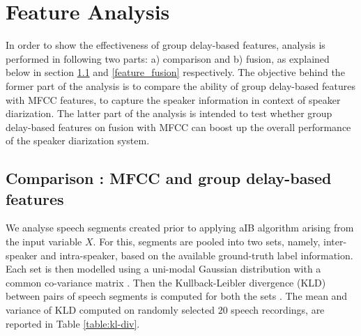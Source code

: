 \documentclass[conference]{IEEEtran}
\begin{document}

\section{Feature Analysis}
\label{feature_analysis_and_fusion}
In order to show the effectiveness of group delay-based features, analysis is
performed in following two parts: a) comparison and b) fusion, as explained
below in section \ref{feature_analysis} and \ref{feature_fusion} respectively.
The objective behind the former part of the analysis is to compare the ability
of group delay-based features with MFCC features, to capture the speaker
information in context of speaker diarization. The latter part of the
analysis is intended to test whether group delay-based features on fusion with
MFCC can boost up the overall performance of the speaker diarization system. 
 
\subsection{Comparison : MFCC and group delay-based features}
\label{feature_analysis}

We analyse speech segments created prior to applying aIB algorithm arising from
the input variable $X$.  For this, segments are pooled into two sets, 
namely, inter-speaker and intra-speaker, based on the available ground-truth 
label information. Each set is then modelled using a uni-modal Gaussian
distribution with a common co-variance matrix \cite{featFilterBank}. 
Then the Kullback-Leibler divergence (KLD) between pairs of 
speech segments is computed for both the
sets \cite{kld}. The mean and variance of KLD computed on randomly selected $20$
speech recordings, are reported in Table \ref{table:kl-div}. 
\end{document}

